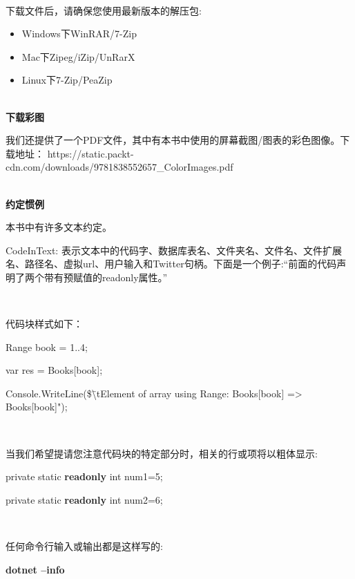 \noindent\textbf{}\ \par
下载文件后，请确保您使用最新版本的解压包: \par

\begin{itemize}
	\item Windows下WinRAR/7-Zip
	\item Mac下Zipeg/iZip/UnRarX
	\item Linux下7-Zip/PeaZip
\end{itemize}

\hspace*{\fill} \\ %
\noindent\textbf{下载彩图}\ \par
我们还提供了一个PDF文件，其中有本书中使用的屏幕截图/图表的彩色图像。下载地址：
https://static.packt-cdn.com/downloads/9781838552657\_ColorImages.pdf \par

\hspace*{\fill} \\ %
\noindent\textbf{约定惯例}\ \par
本书中有许多文本约定。 \par
\textsf{CodeInText}: 表示文本中的代码字、数据库表名、文件夹名、文件名、文件扩展名、路径名、虚拟url、用户输入和Twitter句柄。下面是一个例子:“前面的代码声明了两个带有预赋值的\textsf{readonly}属性。” \par

\noindent\textbf{}\ \par
\noindent 代码块样式如下： \par
		\textsf{Range book = 1..4}; \par
		\textsf{var res = Books[book];} \par
		\textsf{Console.WriteLine(\$\"\textbackslash tElement of array using Range: Books[{book}] => {Books[book]}");} \par

\noindent\textbf{}\ \par
\noindent 当我们希望提请您注意代码块的特定部分时，相关的行或项将以粗体显示: \par
		\textsf{private static \textbf{readonly} int num1=5;} \par
		\textsf{private static \textbf{readonly} int num2=6;} \par
	
\noindent\textbf{}\ \par
\noindent 任何命令行输入或输出都是这样写的:\par
		\textsf{\textbf{dotnet --info}} \par
		

